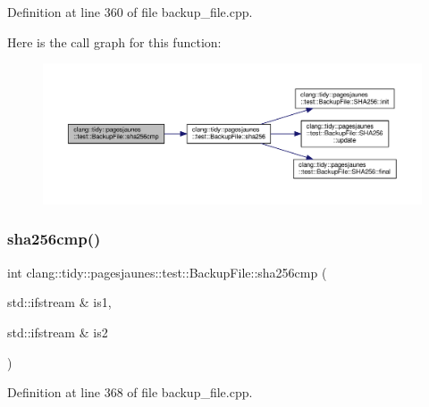 Definition at line 360 of file backup\+\_\+file.\+cpp.

Here is the call graph for this function\+:
\nopagebreak
\begin{figure}[H]
\begin{center}
\leavevmode
\includegraphics[width=350pt]{classclang_1_1tidy_1_1pagesjaunes_1_1test_1_1_backup_file_a68a79fc23d88b23608886199fc3b8673_cgraph}
\end{center}
\end{figure}
\mbox{\label{classclang_1_1tidy_1_1pagesjaunes_1_1test_1_1_backup_file_a62e30ec55b721ae4250ff077a21a780a}} 
\subsubsection{\texorpdfstring{sha256cmp()}{sha256cmp()}\hspace{0.1cm}{\footnotesize\ttfamily [2/2]}}
{\footnotesize\ttfamily int clang\+::tidy\+::pagesjaunes\+::test\+::\+Backup\+File\+::sha256cmp (\begin{DoxyParamCaption}\item[{std\+::ifstream \&}]{is1,  }\item[{std\+::ifstream \&}]{is2 }\end{DoxyParamCaption})}



Definition at line 368 of file backup\+\_\+file.\+cpp.

